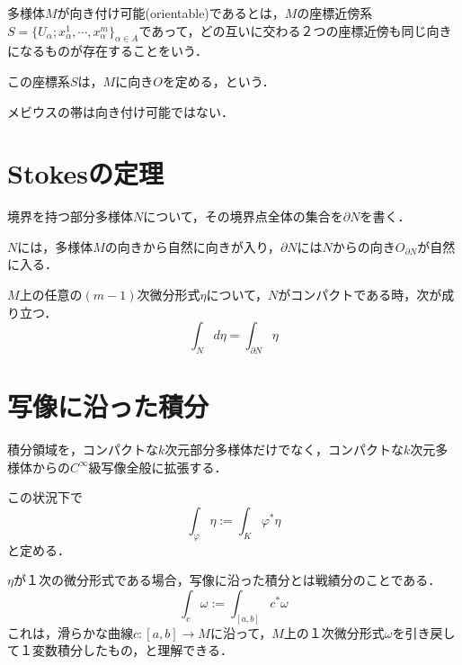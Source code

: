 \documentclass[uplatex, dvipdfmx]{jsreport}
\begin{document}
\begin{definition}[向き付け可能な多様体]
    多様体$M$が向き付け可能(orientable)であるとは，$M$の座標近傍系$S=\{U_\alpha;x^1_\alpha,\cdots,x^m_\alpha\}_{\alpha\in A}$であって，どの互いに交わる２つの座標近傍も同じ向きになるものが存在することをいう．

    この座標系$S$は，$M$に向き$O$を定める，という．
\end{definition}
\begin{example}
    メビウスの帯は向き付け可能ではない．
\end{example}

\section{Stokesの定理}

\begin{notation}
    境界を持つ部分多様体$N$について，その境界点全体の集合を$\partial N$を書く．

    $N$には，多様体$M$の向きから自然に向きが入り，$\partial N$には$N$からの向き$O_{\partial N}$が自然に入る．
\end{notation}

\begin{theorem}
    $M$上の任意の$(m-1)$次微分形式$\eta$について，$N$がコンパクトである時，次が成り立つ．
    \[ \int_Nd\eta =\int_{\partial N}\eta \]
\end{theorem}

\section{写像に沿った積分}

\begin{definition}[写像に沿った積分]
    積分領域を，コンパクトな$k$次元部分多様体だけでなく，コンパクトな$k$次元多様体からの$C^\infty$級写像全般に拡張する．
\begin{center}
\end{center}
この状況下で
\[ \int_\varphi \eta:=\int_K\varphi^*\eta \]
と定める．
\end{definition}
\begin{example}
    $\eta$が１次の微分形式である場合，写像に沿った積分とは戦績分のことである．
    \[ \int_c\omega:=\int_{[a,b]}c^*\omega \]
    これは，滑らかな曲線$c:[a,b]\to M$に沿って，$M$上の１次微分形式$\omega$を引き戻して１変数積分したもの，と理解できる．
\end{example}
\end{document}
